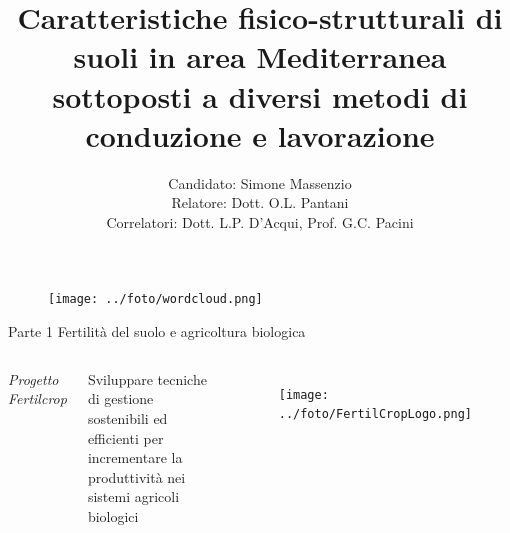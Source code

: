 \documentclass[10pt]{beamer}
\title[25 anni di conduzione biologica in area Mediterranea: uno
studio di fisica del suolo] %
{ Caratteristiche fisico-strutturali di suoli in area Mediterranea
  sottoposti a diversi metodi di conduzione e lavorazione}
\author[Simone Massenzio]{ 
  Candidato: Simone Massenzio \\
  Relatore: Dott. O.L. Pantani\\
  \vspace{0.1cm}
  Correlatori:
  Dott. L.P. D'Acqui, Prof. G.C. Pacini}
\institute[] { \emph{Dipartimento di Scienze della Produzioni Animali e
    dell'Ambiente\\
    Universit\`a degli Studi di Firenze - UniFI\\}
  
}
\date{\displaydate{date}}
\begin{document}
{\1
  \begin{frame}[noframenumbering]%
    \titlepage
  \end{frame}}




\begin{frame}
  \vspace{2cm}
  \begin{figure}
    \centering
    \texttt{[image: ../foto/wordcloud.png]}
  \end{figure}
\end{frame}

\begin{frame}{Parte 1 \small{Fertilità del suolo e agricoltura biologica}}
  \begin{columns}
    
    \emph{Progetto Fertilcrop}
    
    Sviluppare tecniche di gestione sostenibili ed efficienti per
    incrementare la produttività nei sistemi agricoli biologici
    
    \begin{figure}
      \centering
      \texttt{[image: ../foto/FertilCropLogo.png]}
    \end{figure}
  \end{columns}
\end{frame}
\end{document}
